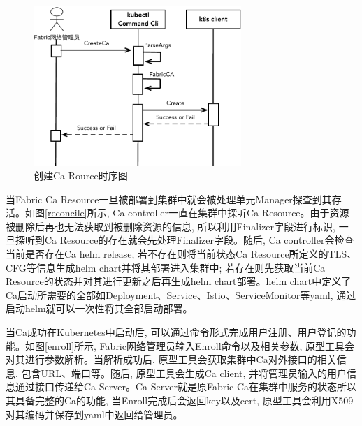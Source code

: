 \begin{figure}[!htbp] %
    \centering %
    \includegraphics[width=0.7\textwidth]{FIGs/chapter4/create_crd.pdf} %
    \caption{创建Ca Rource时序图} %
    \label{create_crd} %
\end{figure}%

当Fabric Ca Resource一旦被部署到集群中就会被处理单元Manager探查到其存活。如图\ref{reconcile}所示, Ca controller一直在集群中探听Ca Resource。由于资源被删除后再也无法获取到被删除资源的信息, 所以利用Finalizer字段进行标识, 一旦探听到Ca Resource的存在就会先处理Finalizer字段。随后, Ca controller会检查当前是否存在Ca helm release, 若不存在则将当前状态Ca Resource所定义的TLS、CFG等信息生成helm chart并将其部署进入集群中; 若存在则先获取当前Ca Resource的状态并对其进行更新之后再生成helm chart部署。helm chart中定义了Ca启动所需要的全部如Deployment、Service、Istio、ServiceMonitor等yaml, 通过启动helm就可以一次性将其全部启动部署。

当Ca成功在Kubernetes中启动后, 可以通过命令形式完成用户注册、用户登记的功能。如图\ref{enroll}所示, Fabric网络管理员输入Enroll命令以及相关参数, 原型工具会对其进行参数解析。当解析成功后, 原型工具会获取集群中Ca对外接口的相关信息, 包含URL、端口等。随后, 原型工具会生成Ca client, 并将管理员输入的用户信息通过接口传递给Ca Server。Ca Server就是原Fabric Ca在集群中服务的状态所以其具备完整的Ca的功能, 当Enroll完成后会返回key以及cert, 原型工具会利用X509对其编码并保存到yaml中返回给管理员。

